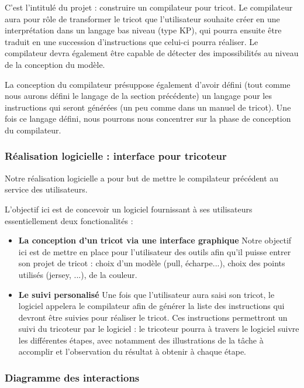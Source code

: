 \documentclass{article}
\begin{document}
C'est l'intitulé du projet : construire un compilateur pour tricot. Le compilateur aura pour rôle de transformer le tricot que
l'utilisateur souhaite créer en une interprétation dans un langage bas niveau (type KP), qui pourra ensuite être traduit en une succession 
d'instructions que celui-ci pourra réaliser. 
Le compilateur devra également être capable de détecter des impossibilités au niveau de la conception du modèle.

La conception du compilateur présuppose également d'avoir défini (tout comme nous aurons défini le langage de la section précédente) un
langage pour les instructions qui seront générées (un peu comme dans un manuel de tricot).
Une fois ce langage défini, nous pourrons nous concentrer sur la phase de conception du compilateur.

\subsubsection{Réalisation logicielle : interface pour tricoteur}

Notre réalisation logicielle a pour but de mettre le compilateur précédent au service des utilisateurs.

L'objectif ici est de concevoir un logiciel fournissant à ses utilisateurs essentiellement deux fonctionalités :
\begin{itemize}
  \item \textbf{La conception d'un tricot via une interface graphique} Notre objectif ici est de mettre en place pour l'utilisateur des
  outils afin qu'il puisse entrer son projet de tricot : choix d'un modèle (pull, écharpe...), choix des points utilisés
  (jersey, ...), de la couleur.
  \item \textbf{Le suivi personalisé} Une fois que l'utilisateur aura saisi son tricot, le logiciel appelera le compilateur afin de générer
la liste des instructions qui devront être suivies pour réaliser le tricot. Ces instructions permettront un suivi du tricoteur par le
logiciel : le tricoteur pourra à travers le logiciel suivre les différentes étapes, avec notamment des illustrations de la tâche à
accomplir et l'observation du résultat à obtenir à chaque étape.
\end{itemize}

\subsubsection{Diagramme des interactions}
\end{document}
